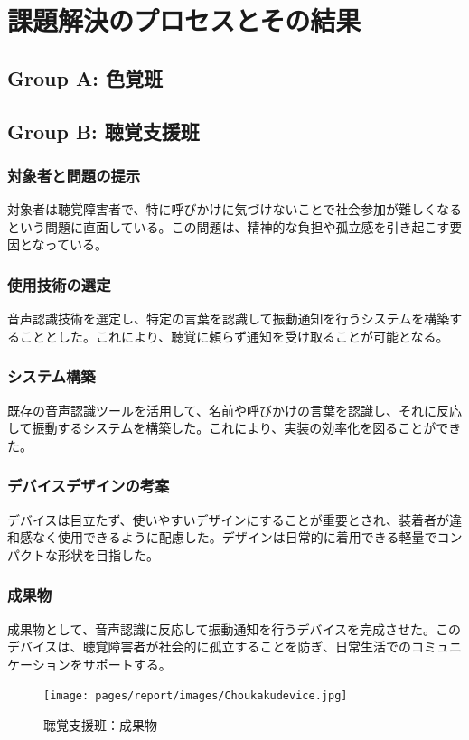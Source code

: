 \section{課題解決のプロセスとその結果}
\subsection{Group A: 色覚班}

\subsection{Group B: 聴覚支援班}
\subsubsection{対象者と問題の提示}
対象者は聴覚障害者で、特に呼びかけに気づけないことで社会参加が難しくなるという問題に直面している。この問題は、精神的な負担や孤立感を引き起こす要因となっている。
\subsubsection{使用技術の選定}
音声認識技術を選定し、特定の言葉を認識して振動通知を行うシステムを構築することとした。これにより、聴覚に頼らず通知を受け取ることが可能となる。
\subsubsection{システム構築}
既存の音声認識ツールを活用して、名前や呼びかけの言葉を認識し、それに反応して振動するシステムを構築した。これにより、実装の効率化を図ることができた。
\subsubsection{デバイスデザインの考案}
デバイスは目立たず、使いやすいデザインにすることが重要とされ、装着者が違和感なく使用できるように配慮した。デザインは日常的に着用できる軽量でコンパクトな形状を目指した。
\subsubsection{成果物}
成果物として、音声認識に反応して振動通知を行うデバイスを完成させた。このデバイスは、聴覚障害者が社会的に孤立することを防ぎ、日常生活でのコミュニケーションをサポートする。
\begin{figure}[h]
  \centering
  \texttt{[image: pages/report/images/Choukakudevice.jpg]}
  \caption{聴覚支援班：成果物}
  \label{fig:Choukakudevice}
\end{figure}
